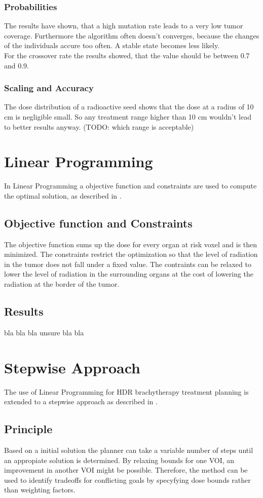 \documentclass[USenglish,twocolumn]{article}
\begin{document}
\subsubsection{Probabilities} 
The results have shown, that a high mutation rate leads to a very low tumor coverage. Furthermore the algorithm often doesn't converges, because the changes of the individuals accure too often. A stable state becomes less likely. \\ For the crossover rate the results showed, that the value should be between 0.7 and 0.9.

\subsubsection{Scaling and Accuracy}
The dose distribution of a radioactive seed shows that the dose at a radius of 10 cm is negligible small. So any treatment range higher than 10 cm wouldn't lead to better results anyway. (TODO: which range is acceptable)

\section{Linear Programming}
In Linear Programming a objective function and constraints are used to compute the optimal solution, as described in \citep{2}.

\subsection{Objective function and Constraints}
The objective function sums up the dose for every organ at risk voxel and is then minimized. The constraints restrict the optimization so that the level of radiation in the tumor does not fall under a fixed value. The contraints can be relaxed to lower the level of radiation in the surrounding organs at the cost of lowering the radiation at the border of the tumor.

\subsection{Results}
bla bla bla
unsure bla bla
\section{Stepwise Approach}
The use of Linear Programming for HDR brachytherapy treatment planning is extended to a stepwise approach as described in \citep{3}.

	\subsection{Principle}
		Based on a initial solution the planner can take a variable number of steps until an appropiate solution is determined. By relaxing bounds for one VOI, an improvement in another VOI might be possible. Therefore, the method can be used to identify tradeoffs for conflicting goals by specyfying dose bounds rather than weighting factors.
\end{document}
